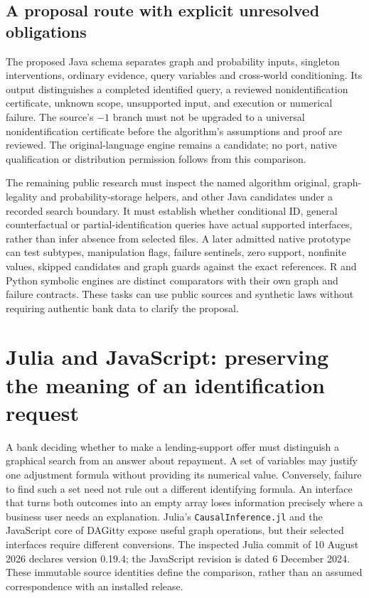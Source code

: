 \subsection{A proposal route with explicit unresolved obligations}

The proposed Java schema separates graph and probability inputs, singleton
interventions, ordinary evidence, query variables and cross-world conditioning.
Its output distinguishes a completed identified query, a reviewed
nonidentification certificate, unknown scope, unsupported input, and execution
or numerical failure. The source's $-1$ branch must not be upgraded to a
universal nonidentification certificate before the algorithm's assumptions and
proof are reviewed. The original-language engine remains a candidate; no port,
native qualification or distribution permission follows from this comparison.

The remaining public research must inspect the named algorithm original,
graph-legality and probability-storage helpers, and other Java candidates under
a recorded search boundary. It must establish whether conditional ID, general
counterfactual or partial-identification queries have actual supported
interfaces, rather than infer absence from selected files. A later admitted
native prototype can test subtypes, manipulation flags, failure sentinels, zero
support, nonfinite values, skipped candidates and graph guards against the
exact references. R and Python symbolic engines are distinct comparators with
their own graph and failure contracts. These tasks can use public sources and
synthetic laws without requiring authentic bank data to clarify the proposal.


\section{Julia and JavaScript: preserving the meaning of an identification request}
\label{exec19:otherid-scope}

A bank deciding whether to make a lending-support offer must distinguish a
graphical search from an answer about repayment. A set of variables may justify
one adjustment formula without providing its numerical value. Conversely,
failure to find such a set need not rule out a different identifying formula.
An interface that turns both outcomes into an empty array loses information
precisely where a business user needs an explanation. Julia's
\texttt{CausalInference.jl} and the JavaScript core of DAGitty expose useful
graph operations, but their selected interfaces require different conversions.
The inspected Julia commit of 10 August 2026 declares version 0.19.4; the
JavaScript revision is dated 6 December 2024. These immutable source identities
define the comparison, rather than an assumed correspondence with an installed
release.~\citep{exec19_otherid_julia,exec19_otherid_dagitty}

